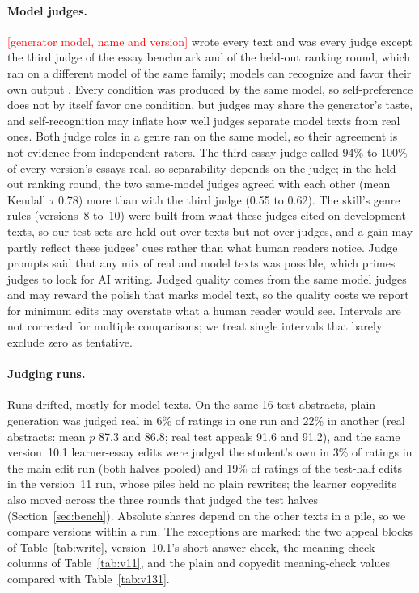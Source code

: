 \documentclass[11pt]{article}
\newcommand{\TBD}[1]{\textcolor{red}{[#1]}}
\newcommand{\genmodel}{\TBD{generator model, name and version}}
\begin{document}
\paragraph{Model judges.} \genmodel{} wrote every text and was every judge except the third judge of the essay benchmark and of the held-out ranking round, which ran on a different model of the same family; models can recognize and favor their own output \citep{panickssery2024llm}. Every condition was produced by the same model, so self-preference does not by itself favor one condition, but judges may share the generator's taste, and self-recognition may inflate how well judges separate model texts from real ones. Both judge roles in a genre ran on the same model, so their agreement is not evidence from independent raters. The third essay judge called 94\% to 100\% of every version's essays real, so separability depends on the judge; in the held-out ranking round, the two same-model judges agreed with each other (mean Kendall $\tau$ 0.78) more than with the third judge (0.55 to 0.62). The skill's genre rules (versions~8 to~10) were built from what these judges cited on development texts, so our test sets are held out over texts but not over judges, and a gain may partly reflect these judges' cues rather than what human readers notice. Judge prompts said that any mix of real and model texts was possible, which primes judges to look for AI writing. Judged quality comes from the same model judges and may reward the polish that marks model text, so the quality costs we report for minimum edits may overstate what a human reader would see. Intervals are not corrected for multiple comparisons; we treat single intervals that barely exclude zero as tentative.

\paragraph{Judging runs.} Runs drifted, mostly for model texts. On the same 16 test abstracts, plain generation was judged real in 6\% of ratings in one run and 22\% in another (real abstracts: mean $p$ 87.3 and 86.8; real test appeals 91.6 and 91.2), and the same version~10.1 learner-essay edits were judged the student's own in 3\% of ratings in the main edit run (both halves pooled) and 19\% of ratings of the test-half edits in the version~11 run, whose piles held no plain rewrites; the learner copyedits also moved across the three rounds that judged the test halves (Section~\ref{sec:bench}). Absolute shares depend on the other texts in a pile, so we compare versions within a run. The exceptions are marked: the two appeal blocks of Table~\ref{tab:write}, version~10.1's short-answer check, the meaning-check columns of Table~\ref{tab:v11}, and the plain and copyedit meaning-check values compared with Table~\ref{tab:v131}.
\end{document}
